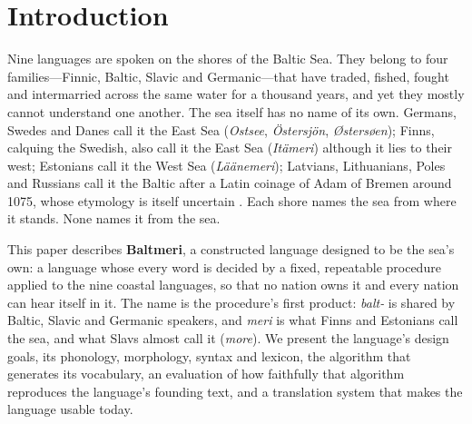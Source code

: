\section{Introduction}\label{sec:intro}

Nine languages are spoken on the shores of the Baltic Sea. They belong to four families---Finnic, Baltic, Slavic and Germanic---that have traded, fished, fought and intermarried across the same water for a thousand years, and yet they mostly cannot understand one another. The sea itself has no name of its own. Germans, Swedes and Danes call it the East Sea (\emph{Ostsee}, \emph{Östersjön}, \emph{Østersøen}); Finns, calquing the Swedish, also call it the East Sea (\emph{Itämeri}) although it lies to their west; Estonians call it the West Sea (\emph{Läänemeri}); Latvians, Lithuanians, Poles and Russians call it the Baltic after a Latin coinage of Adam of Bremen around 1075, whose etymology is itself uncertain \citep{adam1075,jezierski2016}. Each shore names the sea from where it stands. None names it from the sea.

This paper describes \textbf{Baltmeri}, a constructed language designed to be the sea's own: a language whose every word is decided by a fixed, repeatable procedure applied to the nine coastal languages, so that no nation owns it and every nation can hear itself in it. The name is the procedure's first product: \emph{balt-} is shared by Baltic, Slavic and Germanic speakers, and \emph{meri} is what Finns and Estonians call the sea, and what Slavs almost call it (\emph{more}). We present the language's design goals, its phonology, morphology, syntax and lexicon, the algorithm that generates its vocabulary, an evaluation of how faithfully that algorithm reproduces the language's founding text, and a translation system that makes the language usable today.

